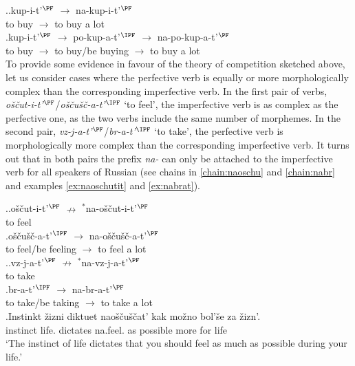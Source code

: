 \ex.\ag.\label{chain:nakupit}kup-i-t'$^{\PF}$ $\rightarrow$ na-kup-i-t'$^{\PF}$\\
{to buy} $\rightarrow$ {to buy a lot}\\
\bg.\label{chain:napokupat}kup-i-t'$^{\PF}$ $\rightarrow$ po-kup-a-t'$^{\IPF}$ $\rightarrow$ na-po-kup-a-t'$^{\PF}$\\
{to buy} $\rightarrow$ {to buy/be buying} $\rightarrow$ {to buy a lot}\\

To provide some evidence in favour of the theory of competition sketched above, let us consider cases where the perfective verb is equally or more morphologically complex than the corresponding imperfective verb. In the first pair of verbs, \textit{o\v{s}\v{c}ut-i-t'}$^{\PF}$\slash\textit{o\v{s}\v{c}u\v{s}\v{c}-a-t'}$^{\IPF}$ `to feel', the imperfective verb is as complex as the perfective one, as the two verbs include the same number of morphemes. In the second pair, \textit{vz-j-a-t'}$^{\PF}$\slash\textit{br-a-t'}$^{\IPF}$ `to take', the perfective verb is morphologically more complex than the corresponding imperfective verb. It turns out that in both pairs the  prefix \textit{na-} can only be attached to the imperfective verb for all speakers of Russian (see chains in \ref{chain:naoschu} and \ref{chain:nabr} and examples \ref{ex:naoschutit} and \ref{ex:nabrat}). 

\ex.\label{chain:naoschu}\ag.o\v{s}\v{c}ut-i-t'$^{\PF}$ $\nrightarrow$ $^*$na-o\v{s}\v{c}ut-i-t'$^{\PF}$\label{chain:oschutit}\\
{to feel} {} {}\\
\bg.\label{chain:oschuschat}o\v{s}\v{c}u\v{s}\v{c}-a-t'$^{\IPF}$ $\rightarrow$ na-o\v{s}\v{c}u\v{s}\v{c}-a-t'$^{\PF}$\\
{to feel/be feeling} $\rightarrow$ {to feel a lot}\\

\ex.\label{chain:nabr}\ag.vz-j-a-t'$^{\PF}$ $\nrightarrow$ $^*$na-vz-j-a-t'$^{\PF}$\label{chain:navzjat}\\
{to take} {} {}\\
\bg.\label{chain:nabrat}br-a-t'$^{\IPF}$ $\rightarrow$ na-br-a-t'$^{\PF}$\\
{to take/be taking} $\rightarrow$ {to take a lot}\\

\exg.\label{ex:naoschutit}Instinkt \v{z}izni diktuet nao\v{s}\v{c}u\v{s}\v{c}at' kak mo\v{z}no bol'\v{s}e za \v{z}izn'.\\
instinct life. dictates na.feel. as possible more for life\\
\trans `The instinct of life dictates that you should feel as much as possible during your life.'\\

